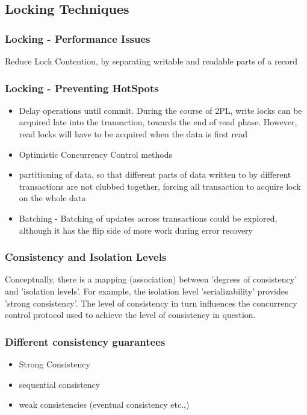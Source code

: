 \documentclass[12]{beamer}
\begin{document}
\subsection{Locking Techniques}

\begin{frame}
	\frametitle{Locking - Performance Issues}
  Reduce Lock Contention, by separating writable and readable parts of a record
\end{frame}

\begin{frame}
\frametitle{Locking - Preventing HotSpots}
\begin{itemize}
\item Delay operations until commit. During the course of 2PL, write locks can be acquired late into the transaction, towards the end of read phase. However, read locks will have to be acquired when the data is first read
\item Optimistic Concurrency Control methods
\item partitioning of data, so that different parts of data written to by different transactions are not clubbed together, forcing all transaction to acquire lock on the whole data
\item Batching - Batching of updates across transactions could be explored, although it has the flip side of more work during error recovery
\end{itemize}
\end{frame}

\begin{frame}
\frametitle{Consistency and Isolation Levels}
Conceptually, there is a mapping (association) between 'degrees of consistency' and 'isolation levels'. For example, the isolation level 'serializability' provides 'strong consistency'. The level of consistency in turn influences the concurrency control protocol used to achieve the level of consistency in question.
\end{frame}

%
%

\begin{frame}
\frametitle{Different consistency guarantees}
\begin{itemize}
\item Strong Consistency
\item sequential consistency
\item weak consistencies (eventual consistency etc.,)
\end{itemize}
\end{frame}
\end{document}
